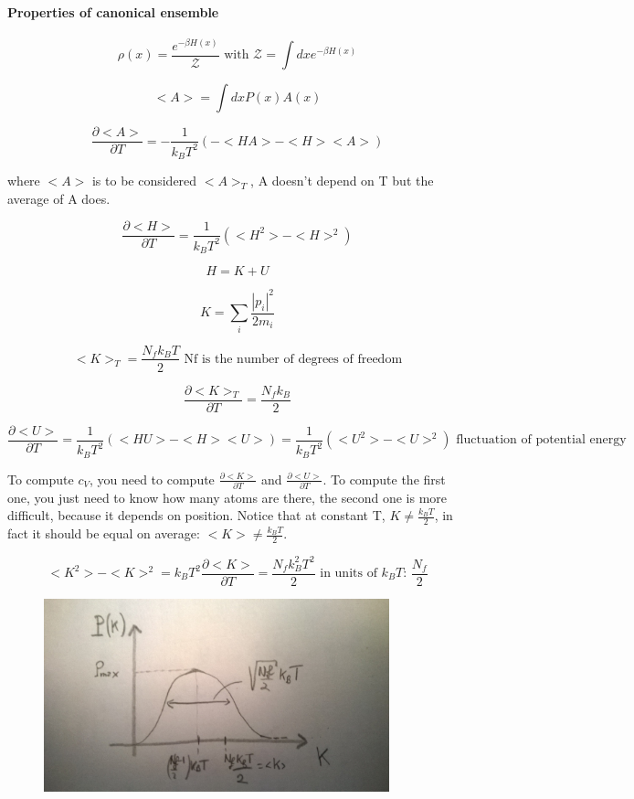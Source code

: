 \documentclass[a4paper, italian, openany]{book}
\begin{document}
\paragraph{Properties of canonical ensemble}

$$\rho (x) = \frac{e^{-\beta H(x)}}{\mathcal{Z}} \mbox{ with } \mathcal{Z} = \int dx e^{-\beta H(x)}$$

$$<A> = \int dx P(x) A(x)$$

$$\frac{\partial <A>}{\partial T} = -\frac{1}{k_B T^2} (-<HA> - <H><A>)$$

where $<A>$ is to be considered $<A>_T$, A doesn't depend on T but the average of A does.

$$\frac{\partial <H>}{\partial T} = \frac{1}{k_B T^2} (<H^2> - <H>^2)$$

$$H = K + U$$

$$K = \sum_i \frac{|p_i|^2}{2 m_i}$$

$$<K>_T = \frac{N_f k_B T}{2} \mbox{ Nf is the number of degrees of freedom}$$

$$\frac{\partial <K>_T}{\partial T} = \frac{N_f k_B}{2}$$

$$\frac{\partial <U>}{\partial T} = \frac{1}{k_B T^2} (<HU> - <H><U>) = \frac{1}{k_B T^2}(<U^2> -<U>^2) \mbox{ fluctuation of potential energy}$$

To compute  $c_V$, you need to compute $\frac{\partial <K>}{\partial T}$ and $\frac{\partial <U>}{\partial T}$. To compute the first one, you just need to know how many atoms are there, the second one is more difficult, because it depends on position.\newline
Notice that at constant T, $K \ne \frac{k_B T}{2}$, in fact it should be equal on average: $<K> \ne \frac{k_B T}{2}$.

$$<K^2> - <K>^2 = k_B T^2 \frac{\partial <K>}{\partial T} = \frac{N_f k_B^2 T^2}{2} \mbox{ in units of $k_B T$: } \frac{N_f}{2}$$

\begin{figure}[H]
\centering
\includegraphics[width=100mm]{img/pic10.jpg}
\end{figure}
\end{document}

